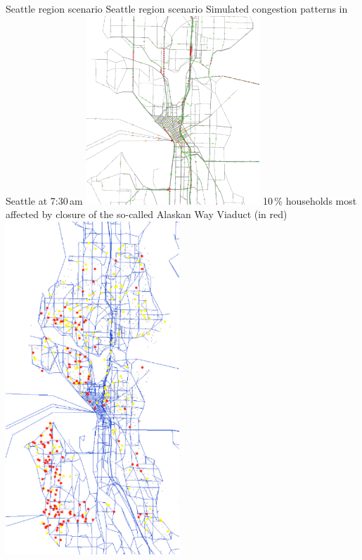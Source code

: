 \createfigure%
{Seattle region scenario}%
{Seattle region scenario}%
{\label{fig:seattle-snapshot}}%
{%
  \createsubfigure%
  {Simulated congestion patterns in Seattle at 7:30\,am}%
  {\includegraphics[width=0.49\textwidth,angle=0]{using/figures/seattle-snapshot-7h30.pdf}}%
  {\label{fig:seattle-snapshot.left}}%
  {}%
  \createsubfigure%
  {10\,\% households most affected by closure of the so-called Alaskan Way Viaduct (in red)}%
	{\includegraphics[width=0.49\textwidth,angle=0]{using/figures/seattle-top-10pct-0it.pdf}}%
  {\label{fig:seattle-snapshot.right}}%
  {}%
}%
{}



